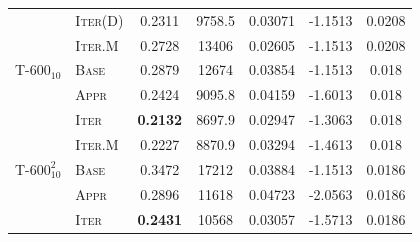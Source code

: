 \begin{table}[H]
\begin{center}
\begin{tabular}{llccccc}
                   & \textsc{Iter(D)} & 0.2311 & 9758.5 & 0.03071 & -1.1513 & 0.0208 \\
                   & \textsc{Iter.M} & 0.2728 & 13406 & 0.02605	& -1.1513 &	0.0208\\
    \hline\rule{0pt}{2.5ex}
    T-$600_{10}$   & \textsc{Base}      & 0.2879 & 12674  & 0.03854 & -1.1513 & 0.018 \\
                   & \textsc{Appr}     & 0.2424 & 9095.8 & 0.04159 & -1.6013 & 0.018 \\
                   & \textsc{Iter}       & \textbf{0.2132} & 8697.9 & 0.02947 & -1.3063 & 0.018 \\
                   & \textsc{Iter.M} & 0.2227	& 8870.9	& 0.03294	& -1.4613	& 0.018 \\
    \hline\rule{0pt}{2.5ex}
    T-$600^2_{10}$ & \textsc{Base}      & 0.3472 & 17212  & 0.03884 & -1.1513 & 0.0186 \\
                   & \textsc{Appr}     & 0.2896 & 11618  & 0.04723 & -2.0563 & 0.0186 \\
                   & \textsc{Iter}       & \textbf{0.2431} & 10568 & 0.03057 & -1.5713 & 0.0186 \\
    \bottomrule
    \end{tabular}
\end{center}
  \label{tab:app_pac}
\end{table}
